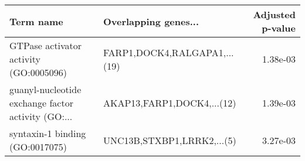 \begin{tabular}{llr}
\toprule
                                         Term name &         Overlapping genes... &  Adjusted p-value \\
\midrule
            GTPase activator activity (GO:0005096) & FARP1,DOCK4,RALGAPA1,...(19) &          1.38e-03 \\
guanyl-nucleotide exchange factor activity (GO:... &   AKAP13,FARP1,DOCK4,...(12) &          1.39e-03 \\
                   syntaxin-1 binding (GO:0017075) &   UNC13B,STXBP1,LRRK2,...(5) &          3.27e-03 \\
\bottomrule
\end{tabular}
